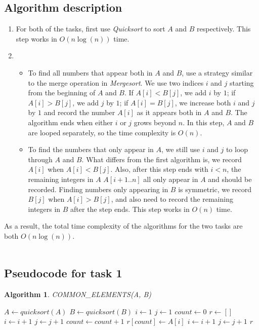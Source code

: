 \documentclass[letterpaper, 11pt]{article}
\newtheorem{algorithm}[lemma]{Algorithm}
\begin{document}
\subsection{Algorithm description}
\begin{enumerate}
\item For both of the tasks, first use \textit{Quicksort} to sort $A$ and $B$ respectively. This step works in $O(n\log(n))$ time.

\item
\begin{itemize}
\item To find all numbers that appear both in $A$ and $B$, use a strategy similar to the merge operation in \textit{Mergesort}. We use two indices $i$ and $j$ starting from the beginning of $A$ and $B$. If $A[i]<B[j]$, we add $i$ by $1$; if $A[i]>B[j]$, we add $j$ by $1$; if $A[i]=B[j]$, we increase both $i$ and $j$ by $1$ and record the number $A[i]$ as it appears both in $A$ and $B$. The algorithm ends when either $i$ or $j$ grows beyond $n$. In this step, $A$ and $B$ are looped separately, so the time complexity is $O(n)$.

\item To find the numbers that only appear in $A$, we still use $i$ and $j$ to loop through $A$ and $B$. What differs from the first algorithm is, we record $A[i]$ when $A[i]<B[j]$. Also, after this step ends with $i < n$, the remaining integers in $A$ $A[i+1..n]$ all only appear in $A$ and should be recorded. Finding numbers only appearing in $B$ is symmetric, we record $B[j]$ when $A[i]>B[j]$, and also need to record the remaining integers in $B$ after the step ends. This step works in $O(n)$ time. 
\end{itemize}
\end{enumerate}
As a result, the total time complexity of the algorithms for the two tasks are both $O(n\log(n))$.
\\
\\
\subsection{Pseudocode for task 1}
\begin{algorithm}
\caption{COMMON\_ELEMENTS(A, B)}
\begin{algorithmic}[1]
\STATE $A \leftarrow quicksort(A)$
\STATE $B \leftarrow quicksort(B)$
\STATE $i \leftarrow 1$
\STATE $j \leftarrow 1$
\STATE $count \leftarrow 0$
\STATE $r \leftarrow []$
        \STATE $i \leftarrow i + 1$
        \STATE $j \leftarrow j + 1$
    \ELSE
        \STATE $count \leftarrow count + 1$
        \STATE $r[count] \leftarrow A[i]$
        \STATE $i \leftarrow i + 1$
        \STATE $j \leftarrow j + 1$
    \ENDIF
\ENDWHILE
\RETURN $r$
\end{algorithmic}
\end{algorithm}
\end{document}
